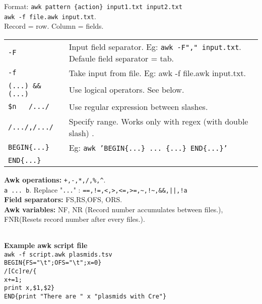 Format: \texttt{awk pattern \{action\} input1.txt input2.txt} \\ \texttt{awk -f file.awk input.txt}.\\ Record = row. Column = fields. \\

\begin{tabularx}{\linewidth}{lX}

\texttt{-F} & Input field separator. Eg: \texttt{awk -F"," input.txt}. Defaule field separator = tab.\\
\texttt{-f} & Take input from file. Eg: awk -f file.awk input.txt.\\
\texttt{(...) \&\& (...)} &  Use logical operators. See below.\\
\texttt{\$n ~ /.../} & Use regular expression between slashes.\\
\texttt{/.../,/.../} & Specify range. Works only with regex (with double slash) .\\
\texttt{BEGIN\{...\}} & Eg: \texttt{awk 'BEGIN\{...\} ... \{...\} END\{...\}'}\\
\texttt{END\{...\}} & \\
\hline
\end{tabularx}
\textbf{Awk operations:} \texttt{+,-,*,/,\%,\^{}}. \\
\texttt{a ... b}. Replace "\texttt{...}" : \texttt{==,!=,<,>,<=,>=,\~{},!\~{},\&\&,||,!a}\\
\textbf{Field separators:} FS,RS,OFS, ORS.\\
\textbf{Awk variables:} NF, NR (Record number accumulates between files.), FNR(Resets record number after every files.).\\

\begin{tabularx}{\linewidth}{lX}
\hline
\end{tabularx}

\textbf{Example awk script file}\\
\texttt{awk -f script.awk plasmids.tsv}\\
\texttt{BEGIN\{FS="\textbackslash t";OFS="\textbackslash t";x=0\}}\\
\texttt{/[Cc]re/\{}\\
\texttt{x+=1;}\\
\texttt{print x,\$1,\$2\}}\\
\texttt{END\{print "There are " x "plasmids with Cre"\}}

\begin{tabularx}{\linewidth}{lX}
\hline
\end{tabularx}

